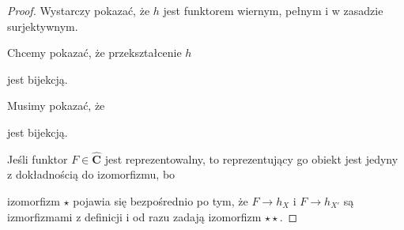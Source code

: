 \begin{proof}
  Wystarczy pokazać, że $h$ jest funktorem wiernym, pełnym i w zasadzie surjektywnym.

  \begin{center}\end{center}

  Chcemy pokazać, że przekształcenie $h$
  \begin{center}\end{center}
  jest bijekcją.




  Musimy pokazać, że

  \begin{center}\end{center}

  jest bijekcją.
  
  Jeśli funktor $F\in\mathbf{\hat{C}}$ jest reprezentowalny, to reprezentujący go obiekt jest jedyny z dokładnością do izomorfizmu, bo

  \begin{center}\end{center}

  izomorfizm $\star$ pojawia się bezpośrednio po tym, że $F\to h_X$ i $F\to h_{X'}$ są izmorfizmami z definicji i od razu zadają izomorfizm $\star\star$.


\end{proof}
